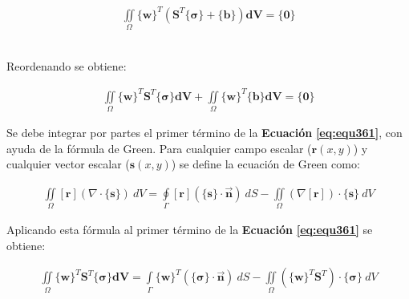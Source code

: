 \begin{ceqn} %
\begin{gather}\label{eq:equ360}
\iint \limits_\Omega \{\mathbf{w}\}^T \left(\mathbf{S}^T\{\mathbf{\sigma}\} + \{\mathbf{b}\}\right)\mathbf{dV} = \{\mathbf{0}\}
\end{gather}   
\end{ceqn}
\\
Reordenando se obtiene:

\begin{ceqn} %
\begin{gather}\label{eq:equ361}
\iint \limits_\Omega \{\mathbf{w}\}^T \mathbf{S}^T\{\mathbf{\sigma}\} \mathbf{dV}+ 
\iint \limits_\Omega \{\mathbf{w}\}^T \{\mathbf{b}\} \mathbf{dV} = \{\mathbf{0}\}
\end{gather}   
\end{ceqn}
\bigskip
Se debe integrar por partes el primer término de la  \textbf{Ecuación} \textbf{\ref{eq:equ361}}, con ayuda de la fórmula de Green. Para cualquier campo escalar ($\mathbf{r}(x,y)$) y cualquier vector escalar ($\mathbf{s}(x,y)$) se define la ecuación de Green como:

\begin{ceqn} %
\begin{gather}\label{eq:equ362}
\iint \limits_\Omega [\mathbf{r}](\nabla \cdot \{\mathbf{s}\})\ dV = 
\oint \limits_\Gamma [\mathbf{r}](\{\mathbf{s}\} \cdot \mathbf{\vec{n}})\ dS -
\iint \limits_\Omega (\nabla [\mathbf{r}]) \cdot \{\mathbf{s}\}\ dV
\end{gather}   
\end{ceqn}

\bigskip
Aplicando esta fórmula al primer término de la \textbf{Ecuación} \textbf{\ref{eq:equ361}} se obtiene:

\begin{ceqn} %
\begin{gather}\label{eq:equ363}
\iint \limits_\Omega \{\mathbf{w}\}^T \mathbf{S}^T\{\mathbf{\sigma}\} \mathbf{dV} = 
\int \limits_\Gamma \{\mathbf{w}\}^T(\{\mathbf{\sigma}\} \cdot \mathbf{\vec{n}})\ dS -
\iint \limits_\Omega (\{\mathbf{w}\}^T \mathbf{S}^T) \cdot \{\mathbf{\sigma}\}\ dV
\end{gather}   
\end{ceqn}

